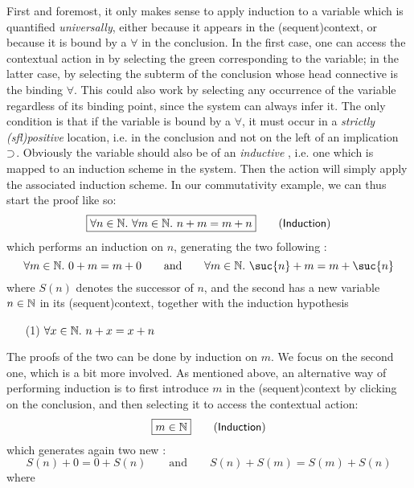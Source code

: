 First and foremost, it only makes sense to apply induction to a variable which
is quantified \emph{universally}, either because it appears in the
\kl(sequent){context}, or because it is bound by a $\forall$ in the conclusion.
In the first case, one can access the contextual action in  by
selecting the green  corresponding to the variable; in the latter case,
by selecting the subterm of the conclusion whose head connective is the binding
$\forall$. This could also work by selecting any occurrence of the
variable regardless of its binding point, since the system can always infer it.
The only condition is that if the variable is bound by a $\forall$, it must
occur in a \emph{strictly \kl(sfl){positive}} location, i.e. in the conclusion
and not on the left of an implication $\supset$. Obviously the variable should
also be of an \emph{inductive} , i.e. one which is mapped to an
induction scheme in the system. Then
the  action will simply apply the associated induction scheme.
In our commutativity example, we can thus start the proof like so:
$$\fbox{$\forall n \in \mathbb{N}.\ \forall m \in \mathbb{N}.\ n + m = m + n$} \qquad
\text{(\textsf{Induction})}$$
which performs an induction on $n$, generating the two following :
$$\forall m \in \nats.\ 0 + m = m + 0 \qquad \text{and} \qquad \forall m \in \nats.\ \suc{n} + m = m + \suc{n}$$
where $S(n)$ denotes the successor of $n$, and the second  has a new
variable $n \in \mathbb{N}$ in its \kl(sequent){context}, together with the induction hypothesis
\begin{itemize}
  \item[(1)] $\forall x \in \mathbb{N}.\ n + x = x + n$
\end{itemize}
The proofs of the two  can be done by induction on $m$. We focus on the
second one, which is a bit more involved. As mentioned above, an alternative way
of performing induction is to first introduce $m$ in the \kl(sequent){context} by clicking on
the conclusion, and then selecting it to access the contextual action:
$$\fbox{$m \in \mathbb{N}$} \qquad \text{(\textsf{Induction})}$$
which generates again two new :
$$S(n) + 0 = 0 + S(n) \qquad \text{and} \qquad S(n) + S(m) = S(m) + S(n)$$ where
